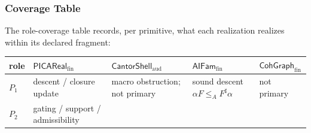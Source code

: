 \documentclass[11pt]{article}
\theoremstyle{definition}
\begin{document}
\subsubsection{Coverage Table}

The role-coverage table records, per primitive, what each realization realizes within its declared fragment:

\begin{longtable}[]{@{}lllll@{}}
\toprule
\begin{minipage}[b]{0.10\columnwidth}\raggedright
role\strut
\end{minipage} & \begin{minipage}[b]{0.17\columnwidth}\raggedright
\(\mathsf{PICAReal}_{\mathrm{fin}}\)\strut
\end{minipage} & \begin{minipage}[b]{0.19\columnwidth}\raggedright
\(\mathsf{CantorShell}_{\mathrm{aud}}\)\strut
\end{minipage} & \begin{minipage}[b]{0.23\columnwidth}\raggedright
\(\mathsf{AIFam}_{\mathrm{fin}}\)\strut
\end{minipage} & \begin{minipage}[b]{0.17\columnwidth}\raggedright
\(\mathsf{CohGraph}_{\mathrm{fin}}\)\strut
\end{minipage}\tabularnewline
\midrule
\endhead
\begin{minipage}[t]{0.10\columnwidth}\raggedright
\(P_{1}\)\strut
\end{minipage} & \begin{minipage}[t]{0.17\columnwidth}\raggedright
descent / closure update\strut
\end{minipage} & \begin{minipage}[t]{0.19\columnwidth}\raggedright
macro obstruction; not primary\strut
\end{minipage} & \begin{minipage}[t]{0.23\columnwidth}\raggedright
sound descent \(\alpha F\le_{A}F^{\sharp}\alpha\)\strut
\end{minipage} & \begin{minipage}[t]{0.17\columnwidth}\raggedright
not primary\strut
\end{minipage}\tabularnewline
\begin{minipage}[t]{0.10\columnwidth}\raggedright
\(P_{2}\)\strut
\end{minipage} & \begin{minipage}[t]{0.17\columnwidth}\raggedright
gating / support / admissibility\strut

\end{minipage}
\end{longtable}
\end{document}
